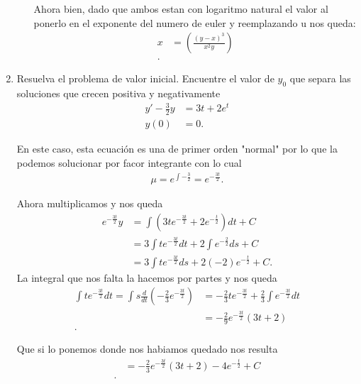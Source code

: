 \begin{enumerate}
\begin{enumerate}
	    Ahora bien, dado que ambos estan con logaritmo natural el valor al ponerlo en el exponente del numero de euler y reemplazando u nos queda:
	    \begin{align*}
	      x &= \left(\frac{\left( y-x \right)^{3}}{x^2y}  \right)  \\
	    .\end{align*}
	\end{enumerate}
      \item Resuelva el problema de valor inicial. Encuentre el valor de $y_0$ que separa las soluciones que crecen positiva y negativamente
	\begin{align*}
	  y' - \frac{3}{2}y &= 3t + 2e^{t}\\
	  y\left( 0 \right) &= 0
	.\end{align*}

	En este caso, esta ecuación es una de primer orden "normal" por lo que la podemos solucionar por facor integrante con lo cual
	\begin{align*}
	  \mu = e^{\int -\frac{3}{2}} = e^{-\frac{3t}{2}}
	.\end{align*}

	Ahora multiplicamos y nos queda
	\begin{align*}
	  e^{-\frac{3t}{2}}y &= \int \left( 3te^{-\frac{3t}{2}}+2e^{-\frac{t}{2}} \right)dt + C \\
	  &= 3 \int te^{-\frac{3t}{2}}dt +2\int e^{-\frac{2}{2}}ds + C \\
	  &= 3\int te^{-\frac{3t}{2}}ds + 2\left( -2 \right) e^{-\frac{t}{2}} + C
	.\end{align*}
	La integral que nos falta la hacemos por partes y nos queda
	\begin{align*}
	  \int te^{-\frac{3t}{2}}dt = \int s \frac{d}{dt}\left( -\frac{2}{3}e^{-\frac{3t}{2}} \right) 
	&= -\frac{2}{3}te^{-\frac{3t}{2}} + \frac{2}{3}\int e^{-\frac{3t}{2}}dt \\
	&= -\frac{2}{9}e^{-\frac{3t}{2}}\left( 3t+2 \right)  \\
	.\end{align*}					

	Que si lo ponemos donde nos habiamos quedado nos resulta
	\begin{align*}
	  &= -\frac{2}{3}e^{-\frac{3t}{2}}\left( 3t+2 \right) -4e^{-\frac{t}{2}} + C \\
	.\end{align*}


\end{enumerate}
